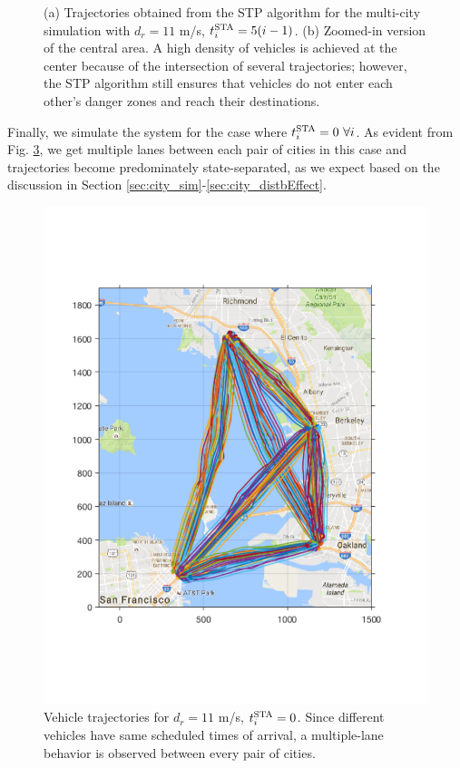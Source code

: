 \begin{figure}[H]
\begin{subfigure}{0.5\textwidth}
  \subcaption{}
  \label{fig:bayArea_d11sep5_zoomed}
\end{subfigure}%
  \caption{(a) Trajectories obtained from the STP algorithm for the multi-city simulation with $d_r = 11$ m/s, $t^\text{STA}_i = 5(i-1)$. (b) Zoomed-in version of the central area. A high density of vehicles is achieved at the center because of the intersection of several trajectories; however, the STP algorithm still ensures that vehicles do not enter each other's danger zones and reach their destinations.} 
  \label{fig:bayArea_d11sep5_all}
\end{figure}

Finally, we simulate the system for the case where $t^\text{STA}_i = 0 ~\forall i$. As evident from Fig. \ref{fig:bayArea_d11sep0}, we get multiple lanes between each pair of cities in this case and trajectories become predominately state-separated, as we expect based on the discussion in Section \ref{sec:city_sim}-\ref{sec:city_distbEffect}.
\begin{figure}[H]
  \centering
  \includegraphics[width=\columnwidth]{figs/bayArea_d11sep0}
  \caption{Vehicle trajectories for $d_r = 11$ m/s, $t^\text{STA}_i = 0$. Since different vehicles have same scheduled times of arrival, a multiple-lane behavior is observed between every pair of cities.} 
  \label{fig:bayArea_d11sep0}
\end{figure}

